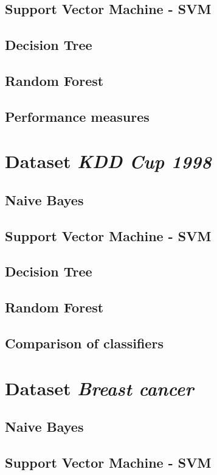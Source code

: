 \documentclass[11pt,a4paper,titlepage]{article}
\begin{document}
\subsection{Support Vector Machine - SVM}
\subsection{Decision Tree}
\subsection{Random Forest}
\subsection{Performance measures}

\section{Dataset \textit{KDD Cup 1998}}
\subsection{Naive Bayes}
\subsection{Support Vector Machine - SVM}
\subsection{Decision Tree}
\subsection{Random Forest}
\subsection{Comparison of classifiers}

\section{Dataset \textit{Breast cancer}}
\subsection{Naive Bayes}
\subsection{Support Vector Machine - SVM}
\end{document}
